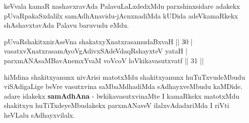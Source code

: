 \begin{artha}
keVvala kamaR nashavxravAda PalavuLaLxdedxMdu parxshinxsidare adakekx pUvaRpakaSxdalilx samAdhAnavidu-jAcnxnadiMda kUDida adeVkamaRkekx shAshavxtavAda Palavu baruvudu eMdu.
\end{artha}


\begin{shl}
pUvaRshakitxnirAseVna shakatxyXnatxrasamudaBxvaH \hfill || 30 |\\
vasatxvXnatxrasamAyoVgAdivxSAdeVdaqRshayxteV yataH |\\
parxmANAsaMBavAnemxYvaM voVcoV loVkikavasutxvatf \hfill || 31 ||
\end{shl}

\begin{artha}
hiMdina shakitxyanunx nivArisi matotxMdu shakitxyanunx huTuTxvudeMbudu viSAdigaLige beVre vasutxvina saMbaMdhadiMda sAdhayxveMbudu kaMDide. adare idakekx \textbf{samAdhAna} - lwkikavasutxvinaMte I kamaRkekx matotxMdu shakitxyu huTiTxdeyeMbudakekx parxmANaveV ilalxvAdadxriMda I riVti heVLalu sAdhayxvilalx.
\end{artha}
